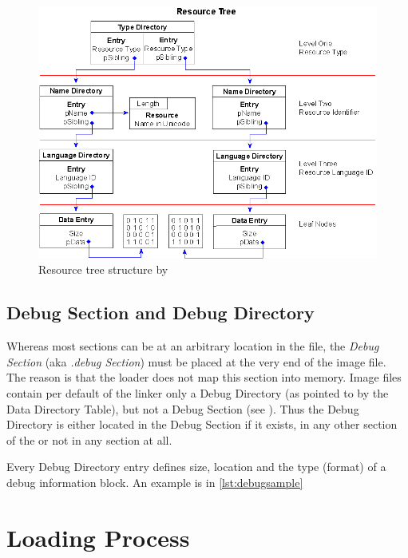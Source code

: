 \begin{figure}
\includegraphics[width=.98\textwidth, height=\textheight,keepaspectratio]{graphics/resourcetree}
\caption{ Resource tree structure by }
\label{fig:resourcetree} 
\end{figure}

\subsection*{Debug Section and Debug Directory}

Whereas most sections can be at an arbitrary location in the file, the \emph{Debug Section} (aka \emph{.debug Section}) must be placed at the very end of the image file. The reason is that the loader does not map this section into memory. Image files contain per default of the linker only a Debug Directory (as pointed to by the Data Directory Table), but not a Debug Section (see \cite[]{pespec}). Thus the Debug Directory is either located in the Debug Section if it exists, in any other section of the \PE{} or not in any section at all.

Every Debug Directory entry defines \ia{} size, location and the type (format) of a debug information block. An example is in \autoref{lst:debugsample}



\section{Loading Process}

